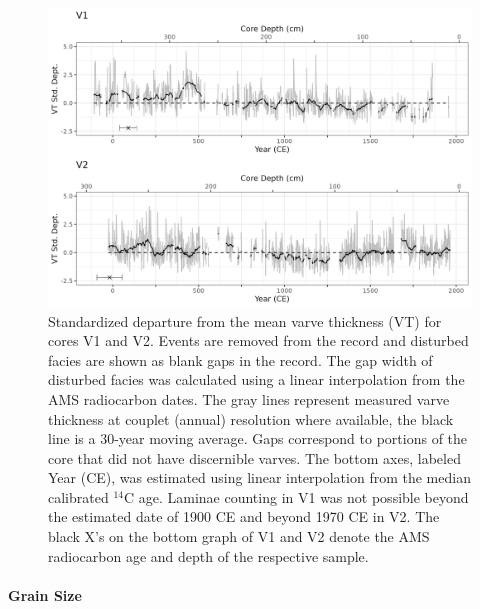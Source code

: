 \documentclass[Royal,times,doublespace,sageh]{sagej}
\begin{document}
\begin{figure}

{\centering \includegraphics[width=1\linewidth]{figs/V1_V2_varvethickness_vs_depth_and_C14_est_yr_ma} 

}

\caption{Standardized departure from the mean varve thickness (VT) for cores V1 and V2. Events are removed from the record and disturbed facies are shown as blank gaps in the record. The gap width of disturbed facies was calculated using a linear interpolation from the AMS radiocarbon dates. The gray lines represent measured varve thickness at couplet (annual) resolution where available, the black line is a 30-year moving average. Gaps correspond to portions of the core that did not have discernible varves. The bottom axes, labeled Year (CE), was estimated using linear interpolation from the median calibrated $^{14}$C age. Laminae counting in V1 was not possible beyond the estimated date of 1900 CE and beyond 1970 CE in V2. The black X's on the bottom graph of V1 and V2 denote the AMS radiocarbon age and depth of the respective sample.\label{varves-a}}\label{fig:varves-a}
\end{figure}

\hypertarget{grain-size}{%
\paragraph{Grain Size}\label{grain-size}}
\end{document}
